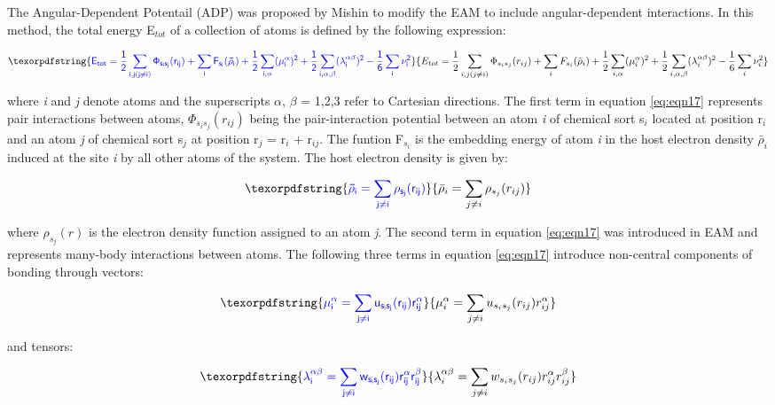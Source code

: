 \documentclass[review]{elsarticle}
\providecommand{\DIFaddtex}[1]{{\protect\color{blue} \sf #1}} %
\providecommand{\DIFadd}[1]{\texorpdfstring{\DIFaddtex{#1}}{#1}} %
\begin{document}
\DIFadd{The Angular-Dependent Potentail (ADP) was proposed by Mishin \cite{mishin2005} to modify the EAM to include angular-dependent interactions. In this method, the total energy E$_{tot}$ of a collection of atoms is defined by the following expression:
}

\begin{equation}
\DIFadd{\label{eq:eqn17}
E_{tot} = \frac{1}{2}\sum_{i,j(j\neq i)}\Phi_{s_{i}s_{j}}(r_{ij}) + \sum_{i} F_{s_{i}}(\bar{\rho}_{i}) + \frac{1}{2}\sum_{i,\alpha}(\mu_{i}^{\alpha})^2 + \frac{1}{2}\sum_{i,\alpha,\beta}(\lambda_{i}^{\alpha \beta})^2 - \frac{1}{6}\sum_{i}\nu_{i}^2
}\end{equation}

\DIFadd{where \textit{i} and \textit{j} denote atoms and the superscripts $\alpha$, $\beta$ = 1,2,3 refer to Cartesian directions. The first term in equation \ref{eq:eqn17} represents pair interactions between atoms, $\Phi_{s_{i}s_{j}}(r_{ij})$ being the pair-interaction potential between an atom \textit{i} of chemical sort s$_{i}$ located at position r$_{i}$ and an atom \textit{j} of chemical sort s$_{j}$ at position r$_{j}$ = r$_{i}$ + r$_{ij}$. The funtion F$_{s_{i}}$ is the embedding energy of atom \textit{i} in the host electron density $\bar{\rho}_{i}$ induced at the site \textit{i} by all other atoms of the system. The host electron density is given by:
}

\begin{equation}
\DIFadd{\label{eq:eqn18}
\bar{\rho}_{i} = \sum_{j \neq i} \rho_{s_{j}}(r_{ij}) 
}\end{equation}

\DIFadd{where $\rho_{s_{j}}(r)$ is the electron density function assigned to an atom \textit{j}. The second term in equation \ref{eq:eqn17} was introduced in EAM and represents many-body interactions between atoms. The following three terms in equation \ref{eq:eqn17} introduce non-central components of bonding through vectors: 
}

\begin{equation}
\DIFadd{\label{eq:eqn19}
\mu_{i}^{\alpha} = \sum_{j \neq i} u_{s_{i}s_{j}}(r_{ij})r_{ij}^{\alpha} 
}\end{equation}

\DIFadd{and tensors:
}

\begin{equation}
\DIFadd{\label{eq:eqn20}
\lambda_{i}^{\alpha \beta} = \sum_{j \neq i} w_{s_{i}s_{j}}(r_{ij})r_{ij}^{\alpha}r_{ij}^{\beta}
}\end{equation}
\end{document}
